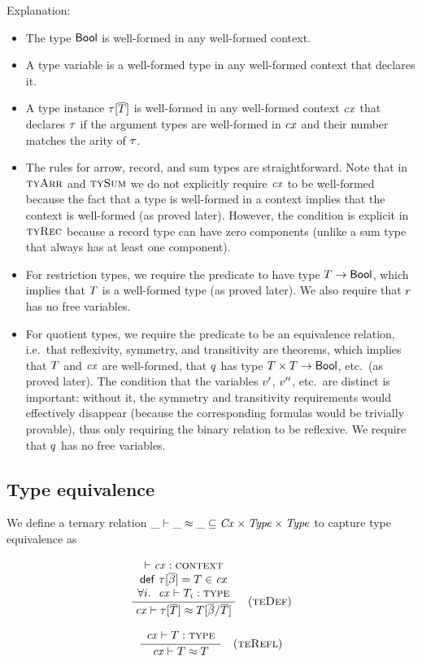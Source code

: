 Explanation:
\begin{itemize}
\item
The type $\mathsf{Bool}$ is well-formed in any well-formed context.
\item
A type variable is a well-formed type in any well-formed context that declares
it.
\item
A type instance $\tau[\overline{T}]$ is well-formed in any well-formed context $\mathit{cx}$ that
declares $\tau$ if the argument types are well-formed in $\mathit{cx}$ and their
number matches the arity of $\tau$.
\item
The rules for arrow, record, and sum types are straightforward. Note that in
$\textsc{tyArr}$ and $\textsc{tySum}$ we do not explicitly require $\mathit{cx}$ to be well-formed
because the fact that a type is well-formed in a context implies that the
context is well-formed (as proved later). However, the condition is explicit
in $\textsc{tyRec}$ because a record type can have zero components (unlike a sum type
that always has at least one component).
\item
For restriction types, we require the predicate to have type
$T\to\mathsf{Bool}$, which implies that $T$ is a well-formed type (as
proved later). We also require that $r$ has no free variables.
\item
For quotient types, we require the predicate to be an equivalence relation,
i.e.\ that reflexivity, symmetry, and transitivity are theorems, which implies
that $T$ and $\mathit{cx}$ are well-formed, that $q$ has type
$T\times T\to\mathsf{Bool}$, etc.\ (as proved later). The condition
that the variables $v'$, $v''$, etc.\ are distinct is important: without
it, the symmetry and transitivity requirements would effectively disappear
(because the corresponding formulas would be trivially provable), thus only
requiring the binary relation to be reflexive. We require that $q$ has
no free variables.
\end{itemize}

\subsection{Type equivalence}

We define a ternary relation $\_\vdash\_\approx\_\subseteq\mathit{Cx}\times\mathit{Type}\times\mathit{Type}$ to capture
type equivalence as

\[
\frac{\begin{array}{c}\vdash\mathit{cx}:\textsc{context}\\\mathsf{def}\ \tau[\overline{\beta}]=T\in\mathit{cx}\\\forall i.\ \ \mathit{cx}\vdash T_i:\textsc{type}\end{array}}{\mathit{cx}\vdash\tau[\overline{T}]\approx T[\overline{\beta}/\overline{T}]}\quad\mbox{(\textsc{teDef})}
\]

\[
\frac{\begin{array}{c}\mathit{cx}\vdash T:\textsc{type}\end{array}}{\mathit{cx}\vdash T\approx T}\quad\mbox{(\textsc{teRefl})}
\]

